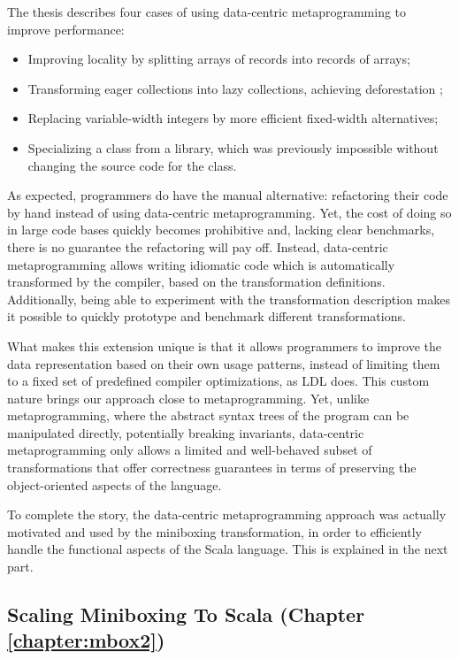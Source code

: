 The thesis describes four cases of using data-centric metaprogramming to improve performance:
\begin{itemize}
  \item Improving locality by splitting arrays of records into records of arrays;
  \item Transforming eager collections into lazy collections, achieving deforestation \cite{wadler-deforestation};
  \item Replacing variable-width integers by more efficient fixed-width alternatives;
  \item Specializing a class from a library, which was previously impossible without changing the source code for the class.
\end{itemize}

As expected, programmers do have the manual alternative: refactoring their code by hand instead of using data-centric metaprogramming. Yet, the cost of doing so in large code bases quickly becomes prohibitive and, lacking clear benchmarks, there is no guarantee the refactoring will pay off. Instead, data-centric metaprogramming allows writing idiomatic code which is automatically transformed by the compiler, based on the transformation definitions. Additionally, being able to experiment with the transformation description makes it possible to quickly prototype and benchmark different transformations.

What makes this extension unique is that it allows programmers to improve the data representation based on their own usage patterns, instead of limiting them to a fixed set of predefined compiler optimizations, as LDL does. This custom nature brings our approach close to metaprogramming. Yet, unlike metaprogramming, where the abstract syntax trees of the program can be manipulated directly, potentially breaking invariants, data-centric metaprogramming only allows a limited and well-behaved subset of transformations that offer correctness guarantees in terms of preserving the object-oriented aspects of the language.

To complete the story, the data-centric metaprogramming approach was actually motivated and used by the miniboxing transformation, in order to efficiently handle the functional aspects of the Scala language. This is explained in the next part.


\subsection{Scaling Miniboxing To Scala (Chapter \ref{chapter:mbox2})}

